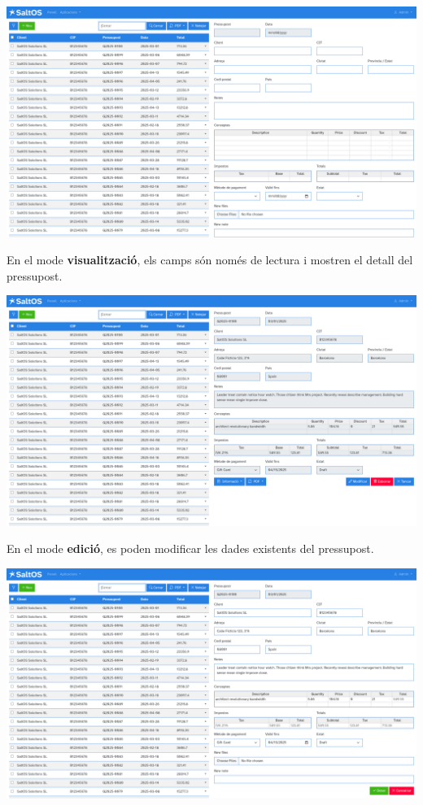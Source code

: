 \documentclass[a4paper]{article}
\begin{document}
\begin{center}\includegraphics[width=1\textwidth]{../ujest/snaps/test-screenshots-js-screenshots-crm-quotes-create-ca-es-1-snap.png}\end{center}

En el mode \textbf{visualització}, els camps són només de lectura i mostren el detall del pressupost.

\begin{center}\includegraphics[width=1\textwidth]{../ujest/snaps/test-screenshots-js-screenshots-crm-quotes-view-100-ca-es-1-snap.png}\end{center}

En el mode \textbf{edició}, es poden modificar les dades existents del pressupost.

\begin{center}\includegraphics[width=1\textwidth]{../ujest/snaps/test-screenshots-js-screenshots-crm-quotes-edit-100-ca-es-1-snap.png}\end{center}
\end{document}
